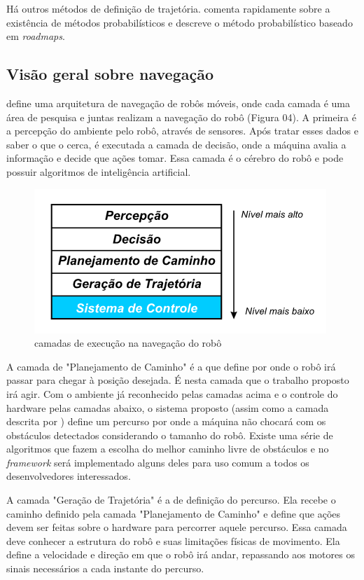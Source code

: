 Há outros métodos de definição de trajetória. \cite{Guzman2008} comenta rapidamente sobre a existência de métodos probabilísticos e \cite{Strandberg2004} descreve o método probabilístico baseado em \textit{roadmaps}.

\subsection{Visão geral sobre navegação}

\cite{Vieira2005} define uma arquitetura de navegação de robôs móveis, onde cada camada é uma área de pesquisa e juntas realizam a navegação do robô (Figura 04). A primeira é a percepção do ambiente pelo robô, através de sensores. Após tratar esses dados e saber o que o cerca, é executada a camada de decisão, onde a máquina avalia a informação e decide que ações tomar. Essa camada é o cérebro do robô e pode possuir algoritmos de inteligência artificial.

\begin{figure}[h]
	\centering	
	\label{fig04}
		\includegraphics[keepaspectratio=true,scale=1]{figuras/arqRoboMoveis0.png}
	\caption{camadas de execução na navegação do robô \cite{Vieira2005}}
\end{figure}

A camada de "Planejamento de Caminho" é a que define por onde o robô irá passar para chegar à posição desejada. É nesta camada que o trabalho proposto irá agir. Com o ambiente já reconhecido pelas camadas acima e o controle do hardware pelas camadas abaixo, o sistema proposto (assim como a camada descrita por \cite{Vieira2005}) define um percurso por onde a máquina não chocará com os obstáculos detectados considerando o tamanho do robô. Existe uma série de algoritmos que fazem a  escolha do melhor caminho livre de obstáculos e no \textit{framework} será implementado alguns deles para uso comum a todos os desenvolvedores interessados.

A camada "Geração de Trajetória" é a de definição do percurso. Ela recebe o caminho definido pela camada "Planejamento de Caminho" e define que ações devem ser feitas sobre o hardware para percorrer aquele percurso. Essa camada deve conhecer a estrutura do robô e suas limitações físicas de movimento. Ela define a velocidade e direção em que o robô irá andar, repassando aos motores os sinais necessários a cada instante do percurso. 

